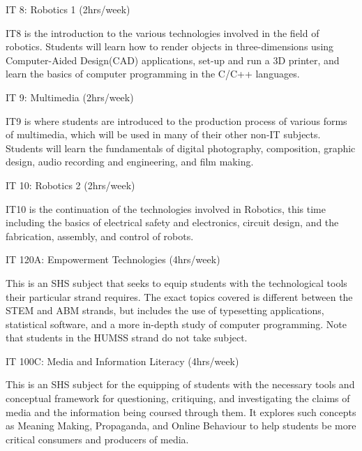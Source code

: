\begin{subject} IT 8: Robotics 1
\hfill
(2hrs/week)
\end{subject}
IT8 is the introduction to the various technologies involved in the field of robotics. Students will learn how to render objects in three-dimensions using Computer-Aided Design(CAD) applications, set-up and run a 3D printer, and learn the basics of computer programming in the C/C++ languages.

\begin{subject} IT 9: Multimedia
\hfill
(2hrs/week)
\end{subject}
IT9 is where students are introduced to the production process of various forms of multimedia, which will be used in many of their other non-IT subjects. Students will learn the fundamentals of digital photography, composition, graphic design, audio recording and engineering, and film making.

\begin{subject} IT 10: Robotics 2
\hfill
(2hrs/week)
\end{subject}
IT10 is the continuation of the technologies involved in Robotics, this time including the basics of electrical safety and electronics, circuit design, and the fabrication, assembly, and control of robots. 

\begin{subject} IT 120A: Empowerment Technologies
\hfill
(4hrs/week)
\end{subject}
This is an SHS subject that seeks to equip students with the technological tools their particular strand requires. The exact topics covered is different between the STEM and ABM strands, but includes the use of typesetting applications, statistical software, and a more in-depth study of computer programming. Note that students in the HUMSS strand do not take subject.

\begin{subject} IT 100C: Media and Information Literacy
\hfill
(4hrs/week)
\end{subject}
This is an SHS subject for the equipping of students with the necessary tools and conceptual framework for questioning, critiquing, and investigating the claims of media and the information being coursed through them. It explores such concepts as Meaning Making, Propaganda, and Online Behaviour to help students be more critical consumers and producers of media.